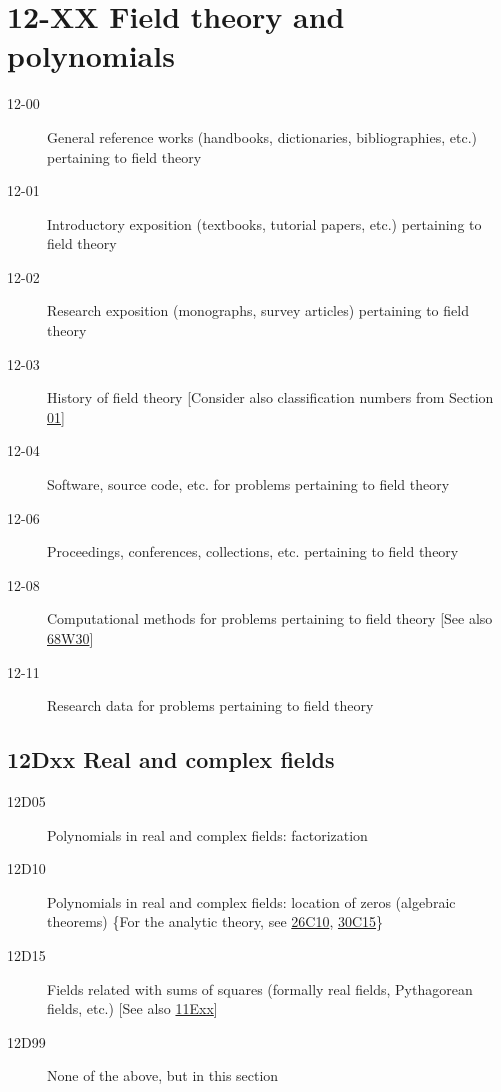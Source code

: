 \section*{12-XX Field theory and polynomials }\label{12-XX}
\begin{description}
\item [12-00]\label{12-00} General reference works (handbooks, dictionaries, bibliographies, etc.) pertaining to field theory
\item [12-01]\label{12-01} Introductory exposition (textbooks, tutorial papers, etc.) pertaining to field theory
\item [12-02]\label{12-02} Research exposition (monographs, survey articles) pertaining to field theory
\item [12-03]\label{12-03} History of field theory [Consider also classification numbers from Section \hyperref[01-XX]{01}]
\item [12-04]\label{12-04} Software, source code, etc. for problems pertaining to field theory
\item [12-06]\label{12-06} Proceedings, conferences, collections, etc. pertaining to field theory
\item [12-08]\label{12-08} Computational methods for problems pertaining to field theory [See also \hyperref[68W30]{68W30}]
\item [12-11]\label{12-11} Research data for problems pertaining to field theory
\end{description}
\subsection*{12Dxx  Real and complex fields }\label{12Dxx}
\begin{description}  
\item [12D05]\label{12D05} Polynomials in real and complex fields: factorization
\item [12D10]\label{12D10} Polynomials in real and complex fields: location of zeros (algebraic theorems) \{For the analytic theory, see \hyperref[26C10]{26C10}, \hyperref[30C15]{30C15}\}
\item [12D15]\label{12D15} Fields related with sums of squares (formally real fields, Pythagorean fields, etc.) [See also \hyperref[11Exx]{11Exx}]
\item [12D99]\label{12D99} None of the above, but in this section
\end{description}
